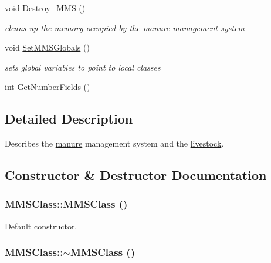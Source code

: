 \begin{DoxyCompactItemize}
void \hyperlink{class_m_m_s_class_a78c62051e79fbcc96544b37f71d19852}{Destroy\_\-MMS} ()
\begin{DoxyCompactList}\small\item\em cleans up the memory occupied by the \hyperlink{classmanure}{manure} management system \item\end{DoxyCompactList}\item 
void \hyperlink{class_m_m_s_class_a9cfb93d7cb67ba68a0a37d5bbea8fb4b}{SetMMSGlobals} ()
\begin{DoxyCompactList}\small\item\em sets global variables to point to local classes \item\end{DoxyCompactList}\item 
int \hyperlink{class_m_m_s_class_a0667b939a3d01931d222696b140b5365}{GetNumberFields} ()
\end{DoxyCompactItemize}


\subsection{Detailed Description}
Describes the \hyperlink{classmanure}{manure} management system and the \hyperlink{classlivestock}{livestock}. 

\subsection{Constructor \& Destructor Documentation}
\hypertarget{class_m_m_s_class_a0fc546f250eed8b990109b05c7241140}{
\subsubsection[{MMSClass}]{\setlength{\rightskip}{0pt plus 5cm}MMSClass::MMSClass ()}}
\label{class_m_m_s_class_a0fc546f250eed8b990109b05c7241140}


Default constructor. \hypertarget{class_m_m_s_class_ae35ad04eea43313d0742a23bdafa6914}{
\subsubsection[{$\sim$MMSClass}]{\setlength{\rightskip}{0pt plus 5cm}MMSClass::$\sim$MMSClass ()}}
\label{class_m_m_s_class_ae35ad04eea43313d0742a23bdafa6914}



